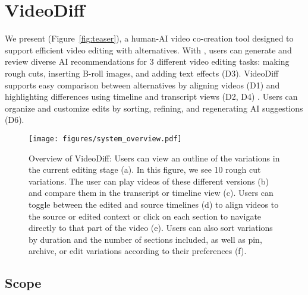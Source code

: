 \section{VideoDiff}
We present \sysname{} (Figure~\ref{fig:teaser}), a human-AI video co-creation tool designed to support efficient video editing with alternatives.
With \sysname{}, users can generate and review diverse AI recommendations for 3 different video editing tasks: making rough cuts, inserting B-roll images, and adding text effects (D3).
VideoDiff supports easy comparison between alternatives by aligning videos (D1) and highlighting differences using timeline and transcript views (D2, D4)
. Users can organize and customize edits by sorting, refining, and regenerating AI suggestions (D6). %


\begin{figure*}
  \centering
  \texttt{[image: figures/system\_overview.pdf]}
  \caption{Overview of VideoDiff: Users can view an outline of the variations in the current editing stage (a). In this figure, we see 10 rough cut variations. The user can play videos of these different versions (b) and compare them in the transcript or timeline view (c).
  Users can toggle between the edited and source timelines (d) to align videos to the source or edited context or click on each section to navigate directly to that part of the video (e).
  Users can also sort variations by duration and the number of sections included, as well as pin, archive, or edit variations according to their preferences (f).}\label{fig:sys_overview}
\end{figure*}


\subsection{Scope}\label{sec:scope}

